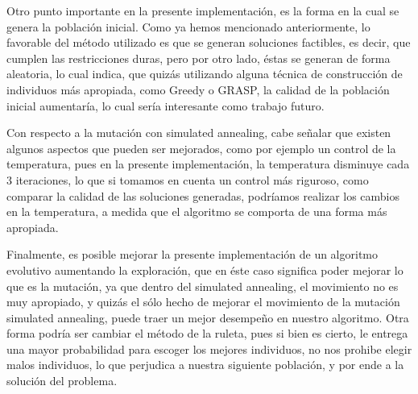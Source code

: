 Otro punto importante en la presente implementación, es la forma en la cual se genera la población inicial.
Como ya hemos mencionado anteriormente, lo favorable del método utilizado es que se generan soluciones factibles,
es decir, que cumplen las restricciones duras, pero por otro lado, éstas se generan de forma aleatoria, lo cual indica,
que quizás utilizando alguna técnica de construcción de individuos más apropiada, como Greedy o GRASP, la calidad de la
población inicial aumentaría, lo cual sería interesante como trabajo futuro.


Con respecto a la mutación con simulated annealing, cabe señalar que existen algunos aspectos que pueden ser mejorados,
como por ejemplo un control de la temperatura, pues en la presente implementación, la temperatura disminuye cada 3 iteraciones,
lo que si tomamos en cuenta un control más riguroso, como comparar la calidad de las soluciones generadas, podríamos
realizar los cambios en la temperatura, a medida que el algoritmo se comporta de una forma más apropiada.


Finalmente, es posible mejorar la presente implementación de un algoritmo evolutivo aumentando la exploración,
que en éste caso significa poder mejorar lo que es la mutación, ya que dentro del simulated annealing, el movimiento
no es muy apropiado, y quizás el sólo hecho de mejorar el movimiento de la mutación simulated annealing, puede
traer un mejor desempeño en nuestro algoritmo. Otra forma podría ser cambiar el método de la ruleta, pues si bien es cierto,
le entrega una mayor probabilidad para escoger los mejores individuos, no nos prohibe elegir malos individuos, lo que
perjudica a nuestra siguiente población, y por ende a la solución del problema.




